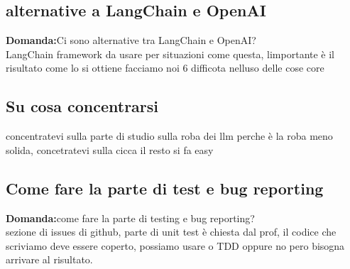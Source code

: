 \documentclass{article}
\begin{document}
\subsection{alternative a LangChain e OpenAI}
\textbf{Domanda:}Ci sono alternative tra LangChain e OpenAI?\\
LangChain framework da usare per situazioni come questa, limportante è
il risultato come lo si ottiene facciamo noi 6 difficota nelluso delle cose core
\subsection{Su cosa concentrarsi}
concentratevi sulla parte di studio sulla roba dei llm perche è la roba meno solida, concetratevi sulla cicca
il resto si fa easy
\subsection{Come fare la parte di test e bug reporting}
\textbf{Domanda:}come fare la parte di testing e bug reporting?\\
sezione di issues di github, parte di unit test è chiesta dal prof,
il codice che scriviamo deve essere coperto, possiamo usare o TDD oppure no pero bisogna arrivare al risultato.
\end{document}
